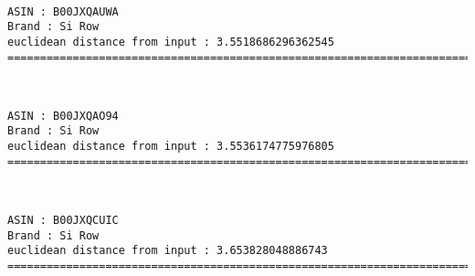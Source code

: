 \documentclass[11pt]{article}
\begin{document}
    
    
    \begin{center}
    \end{center}
    { \hspace*{\fill} \\}
    
    \begin{Verbatim}[commandchars=\\\{\}]
ASIN : B00JXQAUWA
Brand : Si Row
euclidean distance from input : 3.5518686296362545
=============================================================================================================================

    \end{Verbatim}

    
    
    \begin{center}
    \end{center}
    { \hspace*{\fill} \\}
    
    \begin{Verbatim}[commandchars=\\\{\}]
ASIN : B00JXQAO94
Brand : Si Row
euclidean distance from input : 3.5536174775976805
=============================================================================================================================

    \end{Verbatim}

    
    
    \begin{center}
    \end{center}
    { \hspace*{\fill} \\}
    
    \begin{Verbatim}[commandchars=\\\{\}]
ASIN : B00JXQCUIC
Brand : Si Row
euclidean distance from input : 3.653828048886743
=============================================================================================================================

    \end{Verbatim}
\end{document}
